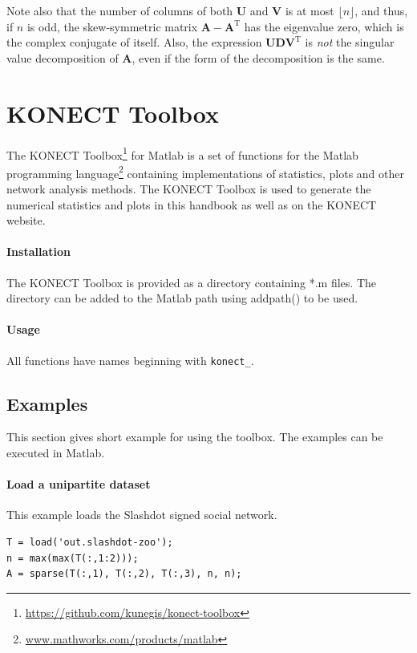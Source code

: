 \documentclass{article}
\begin{document}
Note also that the number of columns of both $\mathbf U$ and $\mathbf V$
is at most $\lfloor n \rfloor$, and thus, if $n$ is odd, the
skew-symmetric matrix $\mathbf A - \mathbf A^{\mathrm T}$ has the
eigenvalue zero, which is the complex conjugate of itself.  Also, the
expression $\mathbf U \mathbf D \mathbf V^{\mathrm T}$ is \emph{not} the
singular value decomposition of $\mathbf A$, even if the form of the
decomposition is the same. 

\section{KONECT Toolbox}
\label{sec:toolbox}

The KONECT 
Toolbox\footnote{\href{https://github.com/kunegis/konect-toolbox}{https://github.com/kunegis/konect-toolbox}}
for Matlab
is a set of functions for the Matlab programming
language\footnote{\href{http://www.mathworks.com/products/matlab/}{www.mathworks.com/products/matlab}}
containing implementations of statistics, plots and other network
analysis methods.  The KONECT Toolbox is used to generate the
numerical statistics and plots in this handbook as well as on the KONECT
website.

\paragraph{Installation}
The KONECT Toolbox is provided as a directory containing *.m files.  The
directory can be added to the Matlab path using addpath() to be used.

\paragraph{Usage}
All functions have names beginning with \texttt{konect\_}.

\subsection{Examples}
This section gives short example for using the toolbox.  The examples
can be executed in Matlab. 

\paragraph{Load a unipartite dataset}
This example loads the Slashdot signed social network. 

\begin{verbatim}
T = load('out.slashdot-zoo');
n = max(max(T(:,1:2)));
A = sparse(T(:,1), T(:,2), T(:,3), n, n); 
\end{verbatim}
\end{document}
